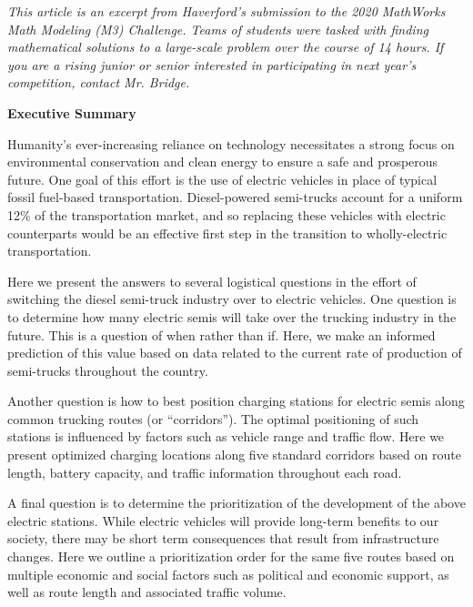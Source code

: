 
\begin{center}
\textit{This article is an excerpt from Haverford's submission to the 2020 MathWorks Math Modeling (M3) Challenge. Teams of students were tasked with finding mathematical solutions to a large-scale problem over the course of 14 hours. If you are a rising junior or senior interested in participating in next year's competition, contact Mr. Bridge.}
\end{center}

\noindent
\textbf{Executive Summary}

Humanity’s ever-increasing reliance on technology necessitates a strong focus on environmental conservation and clean energy to ensure a safe and prosperous future. One goal of this effort is the use of electric vehicles in place of typical fossil fuel-based transportation. Diesel-powered semi-trucks account for a uniform 12\% of the transportation market, and so replacing these vehicles with electric counterparts would be an effective first step in the transition to wholly-electric transportation.

Here we present the answers to several logistical questions in the effort of switching the diesel semi-truck industry over to electric vehicles. One question is to determine how many electric semis will take over the trucking industry in the future. This is a question of when rather than if. Here, we make an informed prediction of this value based on data related to the current rate of production of semi-trucks throughout the country.

Another question is how to best position charging stations for electric semis along common trucking routes (or “corridors”). The optimal positioning of such stations is influenced by factors such as vehicle range and traffic flow. Here we present optimized charging locations along five standard corridors based on route length, battery capacity, and traffic information throughout each road.

A final question is to determine the prioritization of the development of the above electric stations. While electric vehicles will provide long-term benefits to our society, there may be short term consequences that result from infrastructure changes. Here we outline a prioritization order for the same five routes based on multiple economic and social factors such as political and economic support, as well as route length and associated traffic volume.


